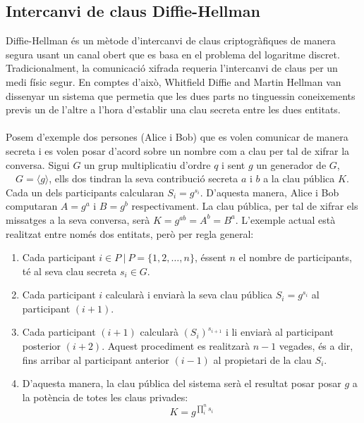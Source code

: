 \documentclass{article}
\begin{document}
\subsection{Intercanvi de claus Diffie-Hellman}
Diffie-Hellman \cite{diffie-hellman} és un mètode d'intercanvi de claus criptogràfiques de manera segura usant un canal obert que es basa en el problema del logaritme discret. Tradicionalment, la comunicació xifrada requeria l'intercanvi de claus per un medi físic segur. En comptes d'això,  Whitfield Diffie and Martin Hellman van dissenyar un sistema que permetia que les dues parts no tinguessin coneixements previs un de l'altre a l'hora d'establir una clau secreta entre les dues entitats.
\\
\\
Posem d'exemple dos persones (Alice i Bob) que es volen comunicar de manera secreta i es volen posar d'acord sobre un nombre com a clau per tal de xifrar la conversa. Sigui $G$ un grup multiplicatiu d'ordre $q$ i sent $g$ un generador de $G$, $\quad G = \langle g \rangle$, ells dos tindran la seva contribució secreta $a$ i $b$ a la clau pública $K$. Cada un dels participants calcularan $S_i = g^{s_i} $. D'aquesta manera, Alice i Bob computaran $A = g^a$ i $B = g^b$ respectivament. La clau pública, per tal de xifrar els missatges a la seva conversa, serà $ K = g^{ab} = A^b = B^a $. L'exemple actual està realitzat entre només dos entitats, però per regla general:
\begin{enumerate}
	\item Cada participant $i \in P \ | \ P = \{1, 2, \dots, n\}$, éssent $n$ el nombre de participants, té al seva clau secreta $s_i \in G$.
	\item Cada participant $i$ calcularà i enviarà la seva clau pública $S_i = g^{s_i}$ al participant $(i+1)$.
	\item Cada participant $(i + 1)$ calcularà $(S_{i})^{s_{i + 1}}$ i li enviarà al participant posterior $(i + 2)$. Aquest procediment es realitzarà $n -1$ vegades, és a dir, fins arribar al participant anterior $(i -1)$ al propietari de la clau $S_i$.
	\item D'aquesta manera, la clau pública del sistema serà el resultat posar posar $g$ a la potència de totes les claus privades:
	\[K = g^{\prod_{i}^{n} s_i}\]
\end{enumerate}
\end{document}
